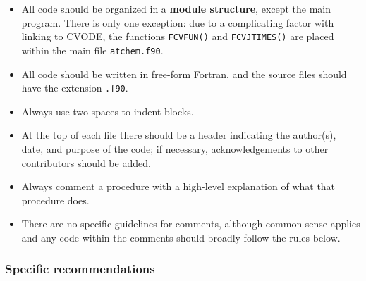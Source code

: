\begin{itemize}
\item All code should be organized in a \textbf{module structure},
  except the main program. There is only one exception: due to a
  complicating factor with linking to CVODE, the functions
  \texttt{FCVFUN()} and \texttt{FCVJTIMES()} are placed within the
  main file \texttt{atchem.f90}.
\item All code should be written in free-form Fortran, and the source
  files should have the extension \texttt{.f90}.
\item Always use two spaces to indent blocks.
\item At the top of each file there should be a header indicating the
  author(s), date, and purpose of the code; if necessary,
  acknowledgements to other contributors should be added.
\item Always comment a procedure with a high-level explanation of what
  that procedure does.
\item There are no specific guidelines for comments, although common
  sense applies and any code within the comments should broadly follow
  the rules below.
\end{itemize}

\subsubsection{Specific recommendations}

